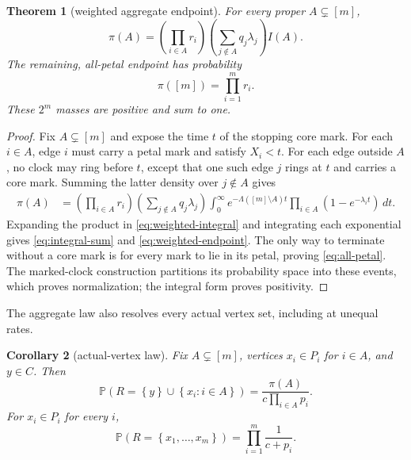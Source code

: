 \documentclass[10pt,a4paper]{amsart}
\newcommand{\PP}{\mathbb P}
\newcommand{\Lam}{\Lambda}
\newcommand{\set}[1]{\left\{#1\right\}}
\newtheorem{theorem}{Theorem}[section]
\newtheorem{corollary}[theorem]{Corollary}
\begin{document}
\begin{theorem}[weighted aggregate endpoint]\label{thm:weighted}
For every proper $A\subsetneq[m]$,
\begin{equation}\label{eq:weighted-endpoint}
 \pi(A)=
 \left(\prod_{i\in A}r_i\right)
 \left(\sum_{j\notin A}q_j\lambda_j\right)I(A).
\end{equation}
The remaining, all-petal endpoint has probability
\begin{equation}\label{eq:all-petal}
 \pi([m])=\prod_{i=1}^{m}r_i.
\end{equation}
These $2^m$ masses are positive and sum to one.
\end{theorem}

\begin{proof}
Fix $A\subsetneq[m]$ and expose the time $t$ of the stopping core mark.  For
each $i\in A$, edge $i$ must carry a petal mark and satisfy $X_i<t$.  For
each edge outside $A$, no clock may ring before $t$, except that one such edge
$j$ rings at $t$ and carries a core mark.  Summing the latter density over
$j\notin A$ gives
\begin{align}
 \pi(A)
 &=\left(\prod_{i\in A}r_i\right)
   \left(\sum_{j\notin A}q_j\lambda_j\right)
   \int_0^\infty
   e^{-\Lam([m]\setminus A)t}
   \prod_{i\in A}(1-e^{-\lambda_i t})\,dt.\label{eq:weighted-integral}
\end{align}
Expanding the product in \eqref{eq:weighted-integral} and integrating each
exponential gives \eqref{eq:integral-sum} and
\eqref{eq:weighted-endpoint}.  The only way to terminate without a core mark
is for every mark to lie in its petal, proving \eqref{eq:all-petal}.
The marked-clock construction partitions its probability space into these
events, which proves normalization; the integral form proves positivity.
\end{proof}

The aggregate law also resolves every actual vertex set, including at
unequal rates.

\begin{corollary}[actual-vertex law]\label{cor:vertices}
Fix $A\subsetneq[m]$, vertices $x_i\in P_i$ for $i\in A$, and $y\in C$.  Then
\begin{equation}\label{eq:actual-core}
 \PP\!\left(
  R=\set{y}\cup\set{x_i:i\in A}
 \right)
 =\frac{\pi(A)}{c\prod_{i\in A}p_i}.
\end{equation}
For $x_i\in P_i$ for every $i$,
\begin{equation}\label{eq:actual-all-petal}
 \PP\!\left(R=\set{x_1,\ldots,x_m}\right)
 =\prod_{i=1}^{m}\frac{1}{c+p_i}.
\end{equation}
\end{corollary}
\end{document}
